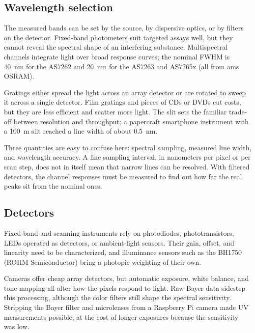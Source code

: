 \subsection{Wavelength selection}

The measured bands can be set by the source, by dispersive optics, or by filters on the detector. Fixed-band photometers suit targeted assays well, but they cannot reveal the spectral shape of an interfering substance.\citep{prairie2020accurate,jesus2025modular} Multispectral channels integrate light over broad response curves; the nominal FWHM is 40~nm for the AS7262 and 20~nm for the AS7263 and AS7265x (all from ams OSRAM).\citep{lopin2025evaluation}

Gratings either spread the light across an array detector or are rotated to sweep it across a single detector.\citep{ju2020fabrication,gonzalez2020development} Film gratings and pieces of CDs or DVDs cut costs, but they are less efficient and scatter more light.\citep{ju2020fabrication,vidal2021use} The slit sets the familiar trade-off between resolution and throughput; a papercraft smartphone instrument with a 100~\textmu m slit reached a line width of about 0.5~nm.\citep{ju2020fabrication}

Three quantities are easy to confuse here: spectral sampling, measured line width, and wavelength accuracy. A fine sampling interval, in nanometers per pixel or per scan step, does not in itself mean that narrow lines can be resolved.\citep{mcgonigle2018smartphone,ju2020fabrication} With filtered detectors, the channel responses must be measured to find out how far the real peaks sit from the nominal ones.\citep{dolgalev2025development}

\subsection{Detectors}

Fixed-band and scanning instruments rely on photodiodes, phototransistors, LEDs operated as detectors, or ambient-light sensors.\citep{prairie2020accurate,nonno2022portuino,bastan2023paired,cirrone2025low} Their gain, offset, and linearity need to be characterized,\citep{prairie2020accurate,nonno2022portuino} and illuminance sensors such as the BH1750 (ROHM Semiconductor) bring a photopic weighting of their own.\citep{jesus2025modular}

Cameras offer cheap array detectors, but automatic exposure, white balance, and tone mapping all alter how the pixels respond to light.\citep{feng2021open,tonelli2021sensing} Raw Bayer data sidestep this processing, although the color filters still shape the spectral sensitivity.\citep{tonelli2021sensing} Stripping the Bayer filter and microlenses from a Raspberry Pi camera made UV measurements possible, at the cost of longer exposures because the sensitivity was low.\citep{wilkes2017low,wilkes2019pispec}

